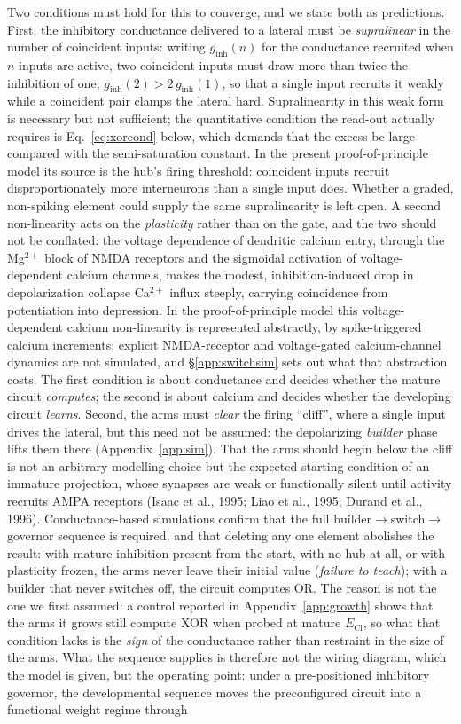 \documentclass[11pt,a4paper]{article}
\newcommand{\ECl}{E_{\mathrm{Cl}}}
\begin{document}
Two conditions must hold for this to converge, and we state both as predictions. First, the inhibitory conductance delivered to a lateral must be \emph{supralinear} in the number of coincident inputs: writing $g_{\mathrm{inh}}(n)$ for the conductance recruited when $n$ inputs are active, two coincident inputs must draw more than twice the inhibition of one, $g_{\mathrm{inh}}(2)>2\,g_{\mathrm{inh}}(1)$, so that a single input recruits it weakly while a coincident pair clamps the lateral hard. Supralinearity in this weak form is necessary but not sufficient; the quantitative condition the read-out actually requires is Eq.~\eqref{eq:xorcond} below, which demands that the excess be large compared with the semi-saturation constant. In the present proof-of-principle model its source is the hub's firing threshold: coincident inputs recruit disproportionately more interneurons than a single input does. Whether a graded, non-spiking element could supply the same supralinearity is left open. A second non-linearity acts on the \emph{plasticity} rather than on the gate, and the two should not be conflated: the voltage dependence of dendritic calcium entry, through the Mg$^{2+}$ block of NMDA receptors and the sigmoidal activation of voltage-dependent calcium channels, makes the modest, inhibition-induced drop in depolarization collapse Ca$^{2+}$ influx steeply, carrying coincidence from potentiation into depression. In the proof-of-principle model this voltage-dependent calcium non-linearity is represented abstractly, by spike-triggered calcium increments; explicit NMDA-receptor and voltage-gated calcium-channel dynamics are not simulated, and \S\ref{app:switchsim} sets out what that abstraction costs. The first condition is about conductance and decides whether the mature circuit \emph{computes}; the second is about calcium and decides whether the developing circuit \emph{learns}. Second, the arms must \emph{clear} the firing ``cliff'', where a single input drives the lateral, but this need not be assumed: the depolarizing \emph{builder} phase lifts them there (Appendix~\ref{app:sim}). That the arms should begin below the cliff is not an arbitrary modelling choice but the expected starting condition of an immature projection, whose synapses are weak or functionally silent until activity recruits AMPA receptors (Isaac et al., 1995; Liao et al., 1995; Durand et al., 1996). Conductance-based simulations confirm that the full builder$\to$switch$\to$governor sequence is required, and that deleting any one element abolishes the result: with mature inhibition present from the start, with no hub at all, or with plasticity frozen, the arms never leave their initial value (\emph{failure to teach}); with a builder that never switches off, the circuit computes OR. The reason is not the one we first assumed: a control reported in Appendix~\ref{app:growth} shows that the arms it grows still compute XOR when probed at mature $\ECl$, so what that condition lacks is the \emph{sign} of the conductance rather than restraint in the size of the arms. What the sequence supplies is therefore not the wiring diagram, which the model is given, but the operating point: under a pre-positioned inhibitory governor, the developmental sequence moves the preconfigured circuit into a functional weight regime through 
\end{document}

